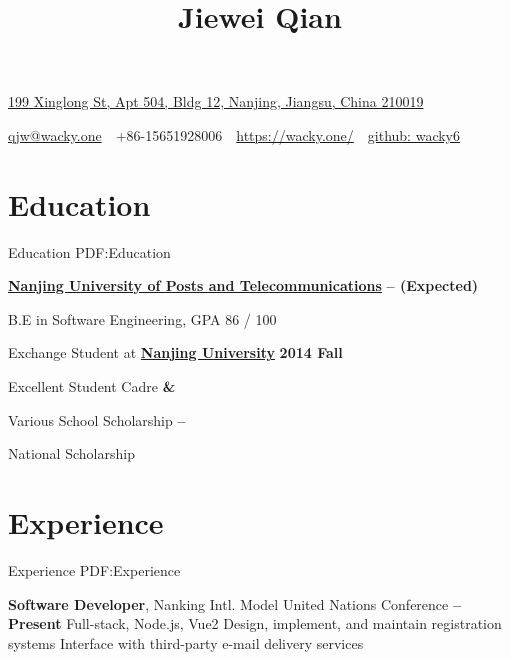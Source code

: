 \documentclass[a4paper,MMMyyyy,nonstop]{simpleresumecv}
\newcommand{\CVAuthor}{Jiewei Qian}
\newcommand{\CVWebpage}{https://wacky.one/}
\begin{document}
\thispagestyle{empty}


\title{\CVAuthor}

\begin{subtitle}
\href{https://www.google.com/maps/place/199+Xing+Long+Da+Jie,+Jianye+Qu,+Nanjing+Shi,+Jiangsu+Sheng,+China,+210019/}
{199 Xinglong St, Apt 504, Bldg 12, Nanjing, Jiangsu, China 210019}
\par
\href{mailto:qjw@wacky.one}
{qjw@wacky.one}
\,\SubBulletSymbol\,
+86-15651928006
\,\SubBulletSymbol\,
\href{\CVWebpage}
{\CVWebpage}
\,\SubBulletSymbol\,
\href{https://github.com/wacky6}
{github: wacky6}
\end{subtitle}

\begin{body}


\section
{Education}
{Education}
{PDF:Education}

\href{http://www.njupt.edu.cn/}
{\textbf{Nanjing University of Posts and Telecommunications}}
\hfill
\textbf{
     --
     (Expected)
}

\SubItem
B.E in Software Engineering, GPA 86 / 100

\SubItem
Exchange Student at \href{http://www.nju.edu.cn/}{\textbf{Nanjing University}}
\hfill
\textbf{
    2014 Fall
}

\SubItem
Excellent Student Cadre
\hfill
\textbf{
     \& 
}

\SubItem
Various School Scholarship
\hfill
\textbf{
     --  
}

\SubItem
National Scholarship
\hfill
\textbf{
}


\section
{Experience}
{Experience}
{PDF:Experience}

\textbf{Software Developer}, Nanking Intl. Model United Nations Conference
\hfill \textbf{
      -- Present
}
\SubItem
Full-stack, Node.js, Vue2
\SubItem
Design, implement, and maintain registration systems
\SubItem
Interface with third-party e-mail delivery services


\end{body}
\end{document}
